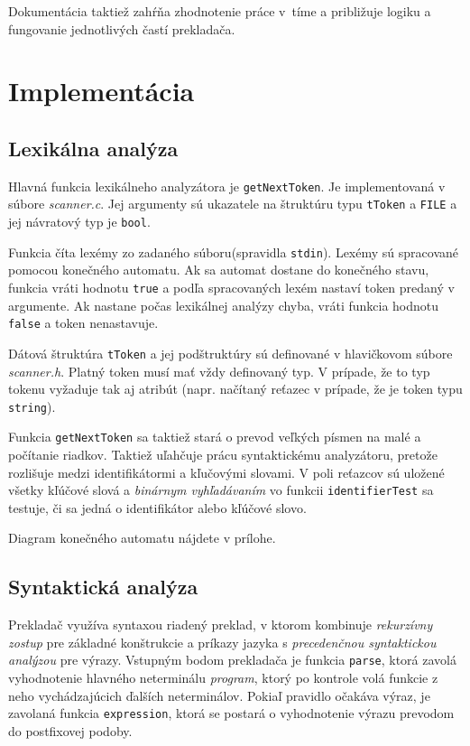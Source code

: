 \documentclass{article}
\begin{document}
        Dokumentácia taktiež zahŕňa zhodnotenie práce v~tíme a približuje logiku a fungovanie
        jednotlivých častí prekladača. 
    
    \section{Implementácia}
    
        \subsection{Lexikálna analýza}
        Hlavná funkcia lexikálneho analyzátora je \texttt{getNextToken}. Je implementovaná v súbore \emph{scanner.c}.
        Jej argumenty sú ukazatele na štruktúru typu \texttt{tToken} a \texttt{FILE} a jej návratový typ je \texttt{bool}. 

        Funkcia číta lexémy zo zadaného súboru(spravidla \texttt{stdin}). Lexémy sú spracované pomocou konečného automatu. 
        Ak sa automat dostane do konečného stavu, funkcia vráti hodnotu \texttt{true} a podľa spracovaných lexém nastaví
        token predaný v argumente. Ak nastane počas lexikálnej analýzy chyba, vráti funkcia hodnotu \texttt{false} a 
        token nenastavuje. 

        Dátová štruktúra \texttt{tToken} a jej podštruktúry sú definované v hlavičkovom súbore \emph{scanner.h}. 
        Platný token musí mať vždy definovaný typ. V prípade, že to typ tokenu vyžaduje tak aj atribút 
        (napr. načítaný reťazec v prípade, že je token typu \texttt{string}). 

        Funkcia \texttt{getNextToken} sa taktiež stará o prevod veľkých písmen na malé a počítanie riadkov.
        Taktiež uľahčuje prácu syntaktickému analyzátoru, pretože rozlišuje medzi identifikátormi a kľučovými slovami.
        V poli reťazcov sú uložené všetky kľúčové slová a \emph{binárnym vyhľadávaním} vo funkcii \texttt{identifierTest} 
        sa testuje, či sa jedná o identifikátor alebo kľúčové slovo.

        Diagram konečného automatu nájdete v prílohe.

        \subsection{Syntaktická analýza}
            Prekladač využíva syntaxou riadený preklad, v ktorom kombinuje \emph{rekurzívny zostup} pre základné konštrukcie
            a príkazy jazyka s \emph{precedenčnou syntaktickou analýzou} pre výrazy.
            Vstupným bodom prekladača je funkcia \texttt{parse}, ktorá zavolá vyhodnotenie hlavného neterminálu \emph{program},
            ktorý po kontrole volá funkcie z neho vychádzajúcich ďalších neterminálov.
            Pokiaľ pravidlo očakáva výraz, je zavolaná funkcia \texttt{expression}, ktorá se postará o vyhodnotenie výrazu prevodom
            do postfixovej podoby.
            
\end{document}
